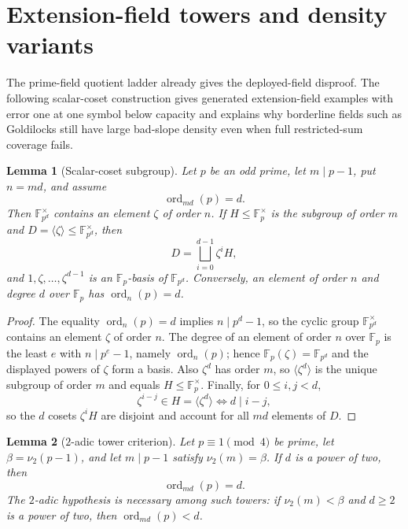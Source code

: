 \documentclass[11pt]{article}
\newtheorem{lemma}[lemma]{Lemma}
\theoremstyle{definition}
\newcommand{\F}{\mathbb F}
\newcommand{\ord}{\operatorname{ord}}
\newcommand{\vtwo}{\nu_2}
\begin{document}
\section{Extension-field towers and density variants}\label{sec:extension-towers}

The prime-field quotient ladder already gives the deployed-field disproof.  The following scalar-coset construction gives generated extension-field examples with error one at one symbol below capacity and explains why borderline fields such as Goldilocks still have large bad-slope density even when full restricted-sum coverage fails.

\begin{lemma}[Scalar-coset subgroup]\label{lem:ext-coset-subgroup}
Let $p$ be an odd prime, let $m\mid p-1$, put $n=md$, and assume
\[
        \ord_{md}(p)=d.
\]
Then $\F_{p^d}^{\times}$ contains an element $\zeta$ of order $n$.  If $H\le\F_p^\times$ is the subgroup of order $m$ and $D=\langle\zeta\rangle\le\F_{p^d}^{\times}$, then
\[
        D=\bigsqcup_{i=0}^{d-1}\zeta^iH,
\]
and $1,\zeta,\ldots,\zeta^{d-1}$ is an $\F_p$-basis of $\F_{p^d}$.  Conversely, an element of order $n$ and degree $d$ over $\F_p$ has $\ord_n(p)=d$.
\end{lemma}

\begin{proof}
The equality $\ord_n(p)=d$ implies $n\mid p^d-1$, so the cyclic group $\F_{p^d}^\times$ contains an element $\zeta$ of order $n$.  The degree of an element of order $n$ over $\F_p$ is the least $e$ with $n\mid p^e-1$, namely $\ord_n(p)$; hence $\F_p(\zeta)=\F_{p^d}$ and the displayed powers of $\zeta$ form a basis.  Also $\zeta^d$ has order $m$, so $\langle\zeta^d\rangle$ is the unique subgroup of order $m$ and equals $H\le\F_p^\times$.  Finally, for $0\le i,j<d$,
\[
        \zeta^{i-j}\in H=\langle\zeta^d\rangle
        \iff d\mid i-j,
\]
so the $d$ cosets $\zeta^iH$ are disjoint and account for all $md$ elements of $D$.
\end{proof}

\begin{lemma}[$2$-adic tower criterion]\label{lem:ext-tower-criterion}
Let $p\equiv1\pmod4$ be prime, let $\beta=\vtwo(p-1)$, and let $m\mid p-1$ satisfy $\vtwo(m)=\beta$.  If $d$ is a power of two, then
\[
        \ord_{md}(p)=d.
\]
The $2$-adic hypothesis is necessary among such towers: if $\vtwo(m)<\beta$ and $d\ge2$ is a power of two, then $\ord_{md}(p)<d$.
\end{lemma}
\end{document}
